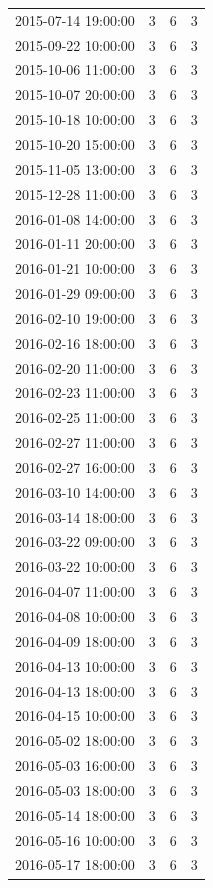 \begin{tabular}{lrrr}
2015-07-14 19:00:00 & 3 & 6 & 3 \\
2015-09-22 10:00:00 & 3 & 6 & 3 \\
2015-10-06 11:00:00 & 3 & 6 & 3 \\
2015-10-07 20:00:00 & 3 & 6 & 3 \\
2015-10-18 10:00:00 & 3 & 6 & 3 \\
2015-10-20 15:00:00 & 3 & 6 & 3 \\
2015-11-05 13:00:00 & 3 & 6 & 3 \\
2015-12-28 11:00:00 & 3 & 6 & 3 \\
2016-01-08 14:00:00 & 3 & 6 & 3 \\
2016-01-11 20:00:00 & 3 & 6 & 3 \\
2016-01-21 10:00:00 & 3 & 6 & 3 \\
2016-01-29 09:00:00 & 3 & 6 & 3 \\
2016-02-10 19:00:00 & 3 & 6 & 3 \\
2016-02-16 18:00:00 & 3 & 6 & 3 \\
2016-02-20 11:00:00 & 3 & 6 & 3 \\
2016-02-23 11:00:00 & 3 & 6 & 3 \\
2016-02-25 11:00:00 & 3 & 6 & 3 \\
2016-02-27 11:00:00 & 3 & 6 & 3 \\
2016-02-27 16:00:00 & 3 & 6 & 3 \\
2016-03-10 14:00:00 & 3 & 6 & 3 \\
2016-03-14 18:00:00 & 3 & 6 & 3 \\
2016-03-22 09:00:00 & 3 & 6 & 3 \\
2016-03-22 10:00:00 & 3 & 6 & 3 \\
2016-04-07 11:00:00 & 3 & 6 & 3 \\
2016-04-08 10:00:00 & 3 & 6 & 3 \\
2016-04-09 18:00:00 & 3 & 6 & 3 \\
2016-04-13 10:00:00 & 3 & 6 & 3 \\
2016-04-13 18:00:00 & 3 & 6 & 3 \\
2016-04-15 10:00:00 & 3 & 6 & 3 \\
2016-05-02 18:00:00 & 3 & 6 & 3 \\
2016-05-03 16:00:00 & 3 & 6 & 3 \\
2016-05-03 18:00:00 & 3 & 6 & 3 \\
2016-05-14 18:00:00 & 3 & 6 & 3 \\
2016-05-16 10:00:00 & 3 & 6 & 3 \\
2016-05-17 18:00:00 & 3 & 6 & 3 \\

\end{tabular}

